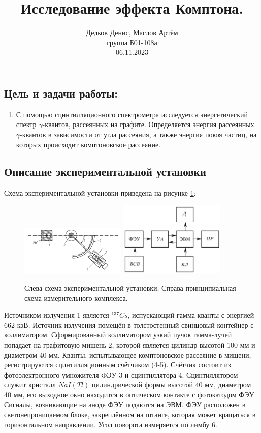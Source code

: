 \documentclass[10pt,a4paper]{article}
\author{\normalsize Дедков Денис, Маслов Артём \\
	\normalsize группа Б01-108а \\
	\normalsize 06.11.2023}
\date{}
\title{
	\Large Исследование эффекта Комптона. \\ 
}
\begin{document}
\maketitle
	
	\subsection*{Цель и задачи работы:}
	\begin{enumerate}
		\item С помощью сцинтилляционного спектрометра исследуется энергетический спектр $\gamma$-квантов, рассеянных на графите. Определяется энергия рассеянных $\gamma$-квантов в зависимости от угла рассеяния, а также энергия покоя частиц, на которых происходит комптоновское рассеяние.
	\end{enumerate}
	
	\subsection*{Описание экспериментальной установки}
	
	Схема экспериментальной установки приведена на рисунке \ref{img:exp_scheme}:
	\begin{figure}[H]
		\centering
		\includegraphics[width=0.45\textwidth]{img/exp_scheme.png}
		\includegraphics[width=0.45\textwidth]{img/prin_scheme.png}
		\caption{Слева схема экспериментальной установки. Справа принципиальная схема измерительного комплекса.}
		\label{img:exp_scheme}
	\end{figure}

	Источником излучения 1 является ${}^{137}Cs$, испускающий гамма-кванты с энергией 662 кэВ. Источник излучения помещён в толстостенный свинцовый контейнер с коллиматором. Сформированный коллиматором узкий пучок гамма-лучей попадает на графитовую мишень 2, которой является цилиндр высотой 100 мм и диаметром 40 мм. Кванты, испытывающее комптоновское рассеяние в мишени, регистрируются сцинтилляционным счётчиком (4-5). Счётчик состоит из фотоэлектронного умножителя ФЭУ 3 и сцинтиллятора 4. Сцинтиллятором служит кристалл $NaI(Tl)$ цилиндрической формы высотой 40 мм, диаметром 40 мм, его выходное окно находится в оптическом контакте с фотокатодом ФЭУ. Сигналы, возникающие на аноде ФЭУ подаются на ЭВМ. ФЭУ расположен в светонепроницаемом блоке, закреплённом на штанге, которая может вращаться в горизонтальном направлении. Угол поворота измеряется по лимбу 6.
	
\end{document}
